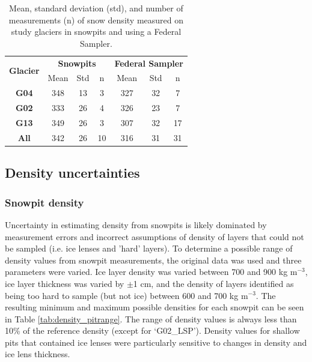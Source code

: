 \documentclass[12pt]{article}
\begin{document}
\begin{table}[b!]
\centering
\caption{Mean, standard deviation (std), and number of measurements (n) of snow density measured on study glaciers in snowpits and using a Federal Sampler. }
\label{tab:density_stats}
\begin{tabular}{ccccccc}
\multirow{2}{*}{\textbf{Glacier}} & \multicolumn{3}{c}{\textbf{Snowpits}}     & \multicolumn{3}{c}{\textbf{Federal Sampler}} \\ 
                                  & Mean & Std & n & Mean  & Std  & n \\ \hline
\textbf{G04}                      & 348           & 13           & 3          & 327            & 32            & 7           \\
\textbf{G02}                      & 333           & 26           & 4          & 326            & 23            & 7           \\
\textbf{G13}                      & 349           & 26           & 3         & 307           & 32            & 17          \\
\textbf{All}                      & 342           & 26           & 10         & 316            & 31             & 31         
\end{tabular}
\end{table}

\subsection*{Density uncertainties}

\subsubsection*{Snowpit density}

Uncertainty in estimating density from snowpits is likely dominated by measurement errors and incorrect assumptions of density of layers that could not be sampled (i.e. ice lenses and 'hard' layers). To determine a possible range of density values from snowpit measurements, the original data was used and three parameters were varied. Ice layer density was varied between 700 and 900 kg m$^{-3}$, ice layer thickness was varied by $\pm$1 cm, and the density of layers identified as being too hard to sample (but not ice) between 600 and 700 kg m$^{-3}$. The resulting minimum and maximum possible densities for each snowpit can be seen in Table \ref{tab:density_pitrange}. The range of density values is always less than 10\% of the reference density (except for `G02\_LSP'). Density values for shallow pits that contained ice lenses were particularly sensitive to changes in density and ice lens thickness. 
\end{document}
